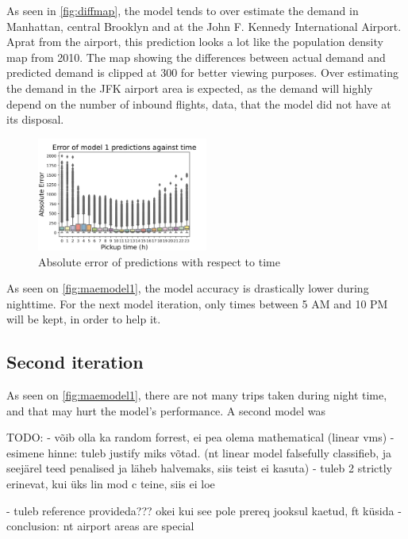 \documentclass[11pt]{article}
\begin{document}
As seen in \autoref{fig:diffmap}, the model tends to over estimate the demand in Manhattan, central Brooklyn and at the John F. Kennedy International Airport. Aprat from the airport, this prediction looks a lot like the population density map \cite{key} from 2010. The map showing the differences between actual demand and predicted demand is clipped at 300 for better viewing purposes. Over estimating the demand in the JFK airport area is expected, as the demand will highly depend on the number of inbound flights, data, that the model did not have at its disposal.

\begin{figure}
    \includegraphics[width=0.5\textwidth]{model1_error_hour.jpeg}
    \centering
    \caption{Absolute error of predictions with respect to time} \label{fig:maemodel1}
\end{figure}

As seen on \autoref{fig:maemodel1}, the model accuracy is drastically lower during nighttime. For the next model iteration, only times between 5 AM and 10 PM will be kept, in order to help it. 


\subsection{Second iteration}

As seen on \autoref*{fig:maemodel1}, there are not many trips taken during night time, and that may hurt the model's performance. A second model was 





\iffalse
    TODO:
    - võib olla ka random forrest, ei pea olema mathematical (linear vms)
    - esimene hinne: tuleb justify miks võtad. (nt linear model falsefully classifieb, ja seejärel teed penalised ja läheb halvemaks, siis teist ei kasuta)
        - tuleb 2 strictly erinevat, kui üks lin mod c teine, siis ei loe

    - tuleb reference provideda??? okei kui see pole prereq jooksul kaetud, ft küsida
    - conclusion: nt airport areas are special
\end{document}
